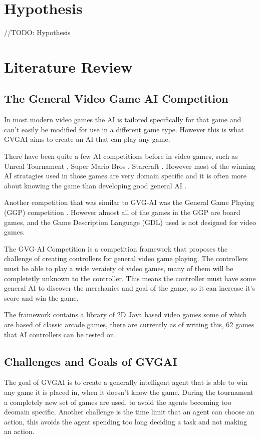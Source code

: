 \documentclass[journal]{IEEEtran}
\begin{document}
\section{Hypothesis}

//TODO: Hypothesis

\section{Literature Review}
\subsection{The General Video Game AI Competition}

In most modern video games the AI is tailored specifically for that game and can't easily be modified for use in a different game type. However this is what GVGAI aims to create an AI that can play any game. 

There have been quite a few AI competitions before in video games, such as Unreal Tournament \cite{hingston2010new}, Super Mario Bros \cite{citationNeeded}, Starcraft \cite{ontanon2013survey} \cite{perez20162014}. 
However most of the winning AI stratagies used in those games are very domain specific and it is often more about knowing the game than developing good general AI \cite{perez20162014}. 
 \par


Another competition that was similar to GVG-AI was the General Game Playing (GGP) competition \cite{GGP2005general}. However almost all of the games in the GGP are board games, and the Game Description Language (GDL) used is not designed for video games.

The GVG-AI Competition is a competition framework that proposes the challenge of creating controllers for general video game playing. The controllers must be able to play a wide veraiety of video games, many of them will be completetly unknown to the controller. This means the controller must have some general AI to discover the merchanics and goal of the game, so it can increase it's score and win the game. \cite{GVGAI, perez20162014}

The framework contains a library of 2D Java based video games some of which are based of classic arcade games, there are currently as of writing this, 62 games that AI controllers can be tested on.


\subsection{Challenges and Goals of GVGAI}
The goal of GVGAI is to create a generally intelligent agent that is able to win any game it is placed in, when it doesn't know the game.
During the tournament a completely new set of games are used, to avoid the agents becoming too deomain specific.
Another challenge is the time limit that an agent can choose an action, this avoids the agent spending too long deciding a task and not making an action. \cite{schuster2015mcts}
\end{document}
